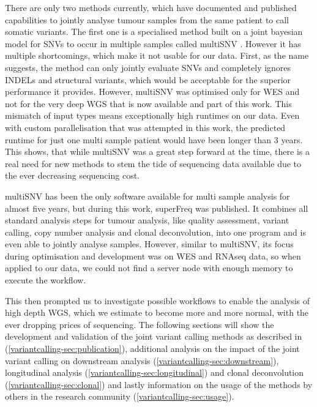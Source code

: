 There are only two methods currently, which have documented and published capabilities to jointly analyse tumour samples from the same patient to call somatic variants. The first one is a specialised method built on a joint bayesian model for SNVs to occur in multiple samples called multiSNV \cite{Josephidou2015}. However it has multiple shortcomings, which make it not usable for our data. First, as the name suggests, the method can only jointly evaluate SNVs and completely ignores INDELs and structural variants, which would be acceptable for the superior performance it provides. However, multiSNV was optimised only for WES and not for the very deep WGS that is now available and part of this work. This mismatch of input types means exceptionally high runtimes on our data. Even with custom parallelisation that was attempted in this work, the predicted runtime for just one multi sample patient would have been longer than 3 years. This shows, that while multiSNV was a great step forward at the time, there is a real need for new methods to stem the tide of sequencing data available due to the ever decreasing sequencing cost.

multiSNV has been the only software available for multi sample analysis for almost five years, but during this work, superFreq \cite{Flensburg2020} was published. It combines all standard analysis steps for tumour analysis, like quality assessment, variant calling, copy number analysis and clonal deconvolution, into one program and is even able to jointly analyse samples. However, similar to multiSNV, its focus during optimisation and development was on WES and RNAseq data, so when applied to our data, we could not find a server node with enough memory to execute the workflow.

This then prompted us to investigate possible workflows to enable the analysis of high depth WGS, which we estimate to become more and more normal, with the ever dropping prices of sequencing. The following sections will show the development and validation of the joint variant calling methods as described in \textcite{Hollizeck2021} (\autoref{variantcalling-sec:publication}), additional analysis on the impact of the joint variant calling on downstream analysis (\autoref{variantcalling-sec:downstream}), longitudinal analysis (\autoref{variantcalling-sec:longitudinal}) and clonal deconvolution (\autoref{variantcalling-sec:clonal}) and lastly information on the usage of the methods by others in the research community (\autoref{variantcalling-sec:usage}).

